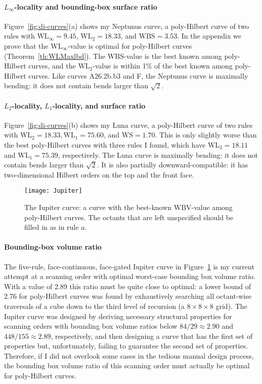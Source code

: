 \documentclass[11pt,a4paper]{article}
\def\WLMax{\ensuremath{\mathrm{WL}_\infty}\xspace}
\def\WLEuc{\ensuremath{\mathrm{WL}_2}\xspace}
\def\WLMan{\ensuremath{\mathrm{WL}_1}\xspace}
\def\WS{\ensuremath{\mathrm{WS}}\xspace}
\def\WBV{\ensuremath{\mathrm{WBV}}\xspace}
\def\WBS{\ensuremath{\mathrm{WBS}}\xspace}
\begin{document}
\paragraph{$L_\infty$-locality and bounding-box surface ratio}
Figure~\ref{fig:di-curves}(a) shows my Neptunus curve, a poly-Hilbert curve of two rules with $\WLMax = 9.45$, $\WLEuc = 18.33$, and $\WBS = 3.53$. In the appendix we prove that the \WLMax-value is optimal for poly-Hilbert curves (Theorem~\ref{th:WLMaxlbd}). The \WBS-value is the best known among poly-Hilbert curves, and the \WLEuc-value is within 1\% of the best known among poly-Hilbert curves.
Like curves A26.2b.b3 and F, the Neptunus curve is maximally bending: it does not contain bends larger than $\sqrt{2}$.

\paragraph{$L_2$-locality, $L_1$-locality, and surface ratio}
Figure~\ref{fig:di-curves}(b) shows my Luna curve, a poly-Hilbert curve of two rules with $\WLEuc = 18.33, \WLMan = 75.60$, and $\WS = 1.70$. This is only slightly worse than the best poly-Hilbert curves with three rules I found, which have $\WLEuc = 18.11$ and $\WLMan = 75.39$, respectively. The Luna curve is maximally bending: it does not contain bends larger than $\sqrt{2}$. It is also partially downward-compatible: it has two-dimensional Hilbert orders on the top and the front face.







\begin{figure}
\centering
\texttt{[image: Jupiter]}
\caption{The Iupiter curve: a curve with the best-known \WBV-value among poly-Hilbert curves. The octants that are left unspecified should be filled in as in rule $a$.}
\label{fig:jupiter}
\end{figure}

\paragraph{Bounding-box volume ratio}
The five-rule, face-continuous, face-gated Iupiter curve in Figure~\ref{fig:jupiter} is my current attempt at a scanning order with optimal worst-case bounding box volume ratio. With a value of 2.89 this ratio must be quite close to optimal: a lower bound of 2.76 for poly-Hilbert curves was found by exhaustively searching all octant-wise traversals of a cube down to the third level of recursion (a $8 \times 8 \times 8$ grid). The Iupiter curve was designed by deriving necessary structural properties for scanning orders with bounding box volume ratios below $84/29 \approx 2.90$ and $448/155 \approx 2.89$, respectively, and then designing a curve that has the first set of properties but, unfortunately, failing to guarantee the second set of properties.
Therefore, if I did not overlook some cases in the tedious manual design process, the bounding box volume ratio of this scanning order must actually be optimal for poly-Hilbert curves.
\end{document}
